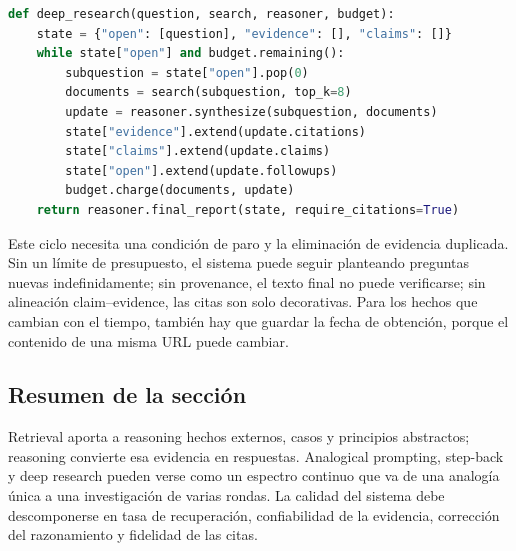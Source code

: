 
\begin{lstlisting}[language=Python,caption={Ciclo de retrieval-reasoning con provenance y condición de paro}]
def deep_research(question, search, reasoner, budget):
    state = {"open": [question], "evidence": [], "claims": []}
    while state["open"] and budget.remaining():
        subquestion = state["open"].pop(0)
        documents = search(subquestion, top_k=8)
        update = reasoner.synthesize(subquestion, documents)
        state["evidence"].extend(update.citations)
        state["claims"].extend(update.claims)
        state["open"].extend(update.followups)
        budget.charge(documents, update)
    return reasoner.final_report(state, require_citations=True)
\end{lstlisting}

Este ciclo necesita una condición de paro y la eliminación de evidencia duplicada. Sin un límite de presupuesto, el sistema puede seguir planteando preguntas nuevas indefinidamente; sin provenance, el texto final no puede verificarse; sin alineación claim--evidence, las citas son solo decorativas. Para los hechos que cambian con el tiempo, también hay que guardar la fecha de obtención, porque el contenido de una misma URL puede cambiar.


\subsection{Resumen de la sección}

Retrieval aporta a reasoning hechos externos, casos y principios abstractos; reasoning convierte esa evidencia en respuestas. Analogical prompting, step-back y deep research pueden verse como un espectro continuo que va de una analogía única a una investigación de varias rondas. La calidad del sistema debe descomponerse en tasa de recuperación, confiabilidad de la evidencia, corrección del razonamiento y fidelidad de las citas.
